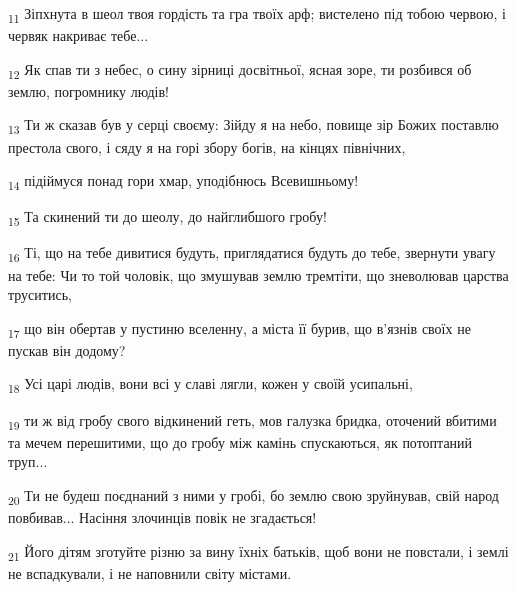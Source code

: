 \begin{tcolorbox}
\textsubscript{11} Зіпхнута в шеол твоя гордість та гра твоїх арф; вистелено під тобою червою, і червяк накриває тебе...
\end{tcolorbox}
\begin{tcolorbox}
\textsubscript{12} Як спав ти з небес, о сину зірниці досвітньої, ясная зоре, ти розбився об землю, погромнику людів!
\end{tcolorbox}
\begin{tcolorbox}
\textsubscript{13} Ти ж сказав був у серці своєму: Зійду я на небо, повище зір Божих поставлю престола свого, і сяду я на горі збору богів, на кінцях північних,
\end{tcolorbox}
\begin{tcolorbox}
\textsubscript{14} підіймуся понад гори хмар, уподібнюсь Всевишньому!
\end{tcolorbox}
\begin{tcolorbox}
\textsubscript{15} Та скинений ти до шеолу, до найглибшого гробу!
\end{tcolorbox}
\begin{tcolorbox}
\textsubscript{16} Ті, що на тебе дивитися будуть, приглядатися будуть до тебе, звернути увагу на тебе: Чи то той чоловік, що змушував землю тремтіти, що зневолював царства труситись,
\end{tcolorbox}
\begin{tcolorbox}
\textsubscript{17} що він обертав у пустиню вселенну, а міста її бурив, що в'язнів своїх не пускав він додому?
\end{tcolorbox}
\begin{tcolorbox}
\textsubscript{18} Усі царі людів, вони всі у славі лягли, кожен у своїй усипальні,
\end{tcolorbox}
\begin{tcolorbox}
\textsubscript{19} ти ж від гробу свого відкинений геть, мов галузка бридка, оточений вбитими та мечем перешитими, що до гробу між камінь спускаються, як потоптаний труп...
\end{tcolorbox}
\begin{tcolorbox}
\textsubscript{20} Ти не будеш поєднаний з ними у гробі, бо землю свою зруйнував, свій народ повбивав... Насіння злочинців повік не згадається!
\end{tcolorbox}
\begin{tcolorbox}
\textsubscript{21} Його дітям зготуйте різню за вину їхніх батьків, щоб вони не повстали, і землі не вспадкували, і не наповнили світу містами.
\end{tcolorbox}
